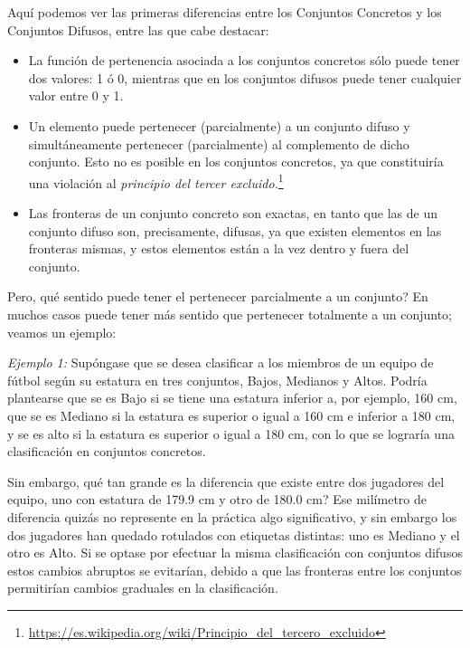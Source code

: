 Aquí podemos ver las primeras diferencias entre los Conjuntos Concretos y los Conjuntos Difusos, entre las que cabe destacar:
\begin{itemize}
	\item La función de pertenencia asociada a los conjuntos concretos sólo puede
	tener dos valores: 1 ó 0, mientras que en los conjuntos difusos puede
	tener cualquier valor entre 0 y 1.
	\item Un elemento puede pertenecer (parcialmente) a un conjunto difuso y
	simultáneamente pertenecer (parcialmente) al complemento de dicho
	conjunto. Esto no es posible en los conjuntos concretos, ya que
	constituiría una violación al \textit{principio del tercer excluido.}\footnote{\url{https://es.wikipedia.org/wiki/Principio_del_tercero_excluido}}
	\item Las fronteras de un conjunto concreto son exactas, en tanto que las de
	un conjunto difuso son, precisamente, difusas, ya que existen elementos
	en las fronteras mismas, y estos elementos están a la vez dentro y fuera
	del conjunto.
\end{itemize}

Pero, qué sentido puede tener el pertenecer parcialmente a un conjunto? En
muchos casos puede tener más sentido que pertenecer totalmente a un
conjunto; veamos un ejemplo:

\textit{Ejemplo 1:} Supóngase que se desea clasificar a los miembros de un equipo
de fútbol según su estatura en tres conjuntos, Bajos, Medianos y Altos.
Podría plantearse que se es Bajo si se tiene una estatura inferior a, por
ejemplo, 160 cm, que se es Mediano si la estatura es superior o igual a 160
cm e inferior a 180 cm, y se es alto si la estatura es superior o igual a 180
cm, con lo que se lograría una clasificación en conjuntos concretos. \label{ej:1}

Sin embargo, qué tan grande es la diferencia que existe entre dos jugadores
del equipo, uno con estatura de 179.9 cm y otro de 180.0 cm? Ese milímetro
de diferencia quizás no represente en la práctica algo significativo, y sin
embargo los dos jugadores han quedado rotulados con etiquetas distintas:
uno es Mediano y el otro es Alto. Si se optase por efectuar la misma
clasificación con conjuntos difusos estos cambios abruptos se evitarían,
debido a que las fronteras entre los conjuntos permitirían cambios graduales
en la clasificación.

